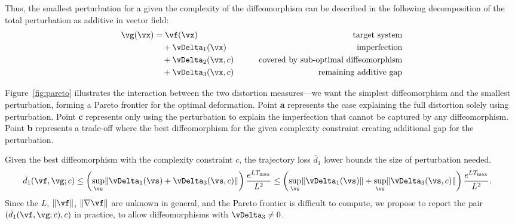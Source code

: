 \documentclass{article}
\theoremstyle{definition} \newtheorem{definition}{Definition}  \newtheorem{example}{Example}
\theoremstyle{remark} \newtheorem{remark}{Remark}
\newcounter{ct}
\DeclarePairedDelimiter{\norm}{\lVert}{\rVert}
\begin{document}
Thus, the smallest perturbation for a given the complexity of the diffeomorphism can be described in the following decomposition of the total perturbation as additive in vector field:
\begin{align}\label{eq:decomp:triple}
    \vg(\vx) &= 
	\vf(\vx)
	&\qquad\text{target system}
	\\
	&\quad+\vDelta_1(\vx)
	&\qquad\text{imperfection}
	\\
	&\quad+\vDelta_2(\vx, c)
	&\qquad\text{covered by sub-optimal diffeomorphism}
	\\
	&\quad+\vDelta_3(\vx, c)
	&\qquad\text{remaining additive gap}
\end{align}

Figure~\ref{fig:pareto} illustrates the interaction between the two distortion measures---we want the simplest diffeomorphism and the smallest perturbation, forming a Pareto frontier for the optimal deformation.
Point \textbf{a} represents the case explaining the full distortion solely using perturbation.
Point \textbf{c} represents only using the perturbation to explain the imperfection that cannot be captured by any diffeomorphism.
Point \textbf{b} represents a trade-off where the best diffeomorphism for the given complexity constraint creating additional gap for the perturbation.

Given the best diffeomorphism with the complexity constraint $c$, the trajectory loss $\bar{d}_1$ lower bounds the size of perturbation needed.
\begin{align}
    \bar{d}_1(\vf, \vg; c)
	&\leq
	    \left(\sup_\vs \norm{\vDelta_1(\vs) + \vDelta_3(\vs, c)}\right)
	    \frac{e^{LT_{\text{max}}}}{L^2}
	\leq
	    \left(\sup_\vs\norm{\vDelta_1(\vs)} + \sup_\vs\norm{\vDelta_3(\vs, c)}\right)
	    \frac{e^{LT_{\text{max}}}}{L^2}.
\end{align}
Since the $L$, $\norm{\vf}$, $\norm{\nabla\vf}$ are unknown in general, and the Pareto frontier is difficult to compute, we propose to report the pair $(\bar{d}_1(\vf, \vg; c), c)$ in practice, to allow diffeomorphisms with $\vDelta_3 \neq 0$.
\end{document}
